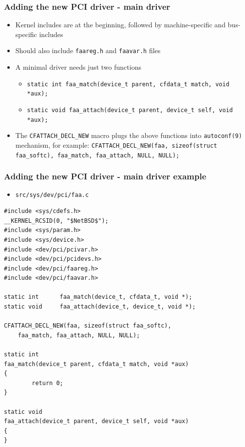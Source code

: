 \documentclass[dvipsnames,table]{beamer}
\begin{document}
\begin{frame}
\frametitle{Adding the new PCI driver - main driver}
\begin{itemize}
	\item Kernel includes are at the beginning, followed by machine-specific and bus-specific includes
	\item Should also include {\tt faareg.h} and {\tt faavar.h} files
	\item A minimal driver needs just two functions
	\begin{itemize}
		\item {\tt static int faa\_match(device\_t parent, cfdata\_t match, void *aux);}
		\item {\tt static void faa\_attach(device\_t parent, device\_t self, void *aux);}
	\end{itemize}
	\item The {\tt CFATTACH\_DECL\_NEW} macro plugs the above functions into {\tt autoconf(9)} mechanism, for example:
	{\tt CFATTACH\_DECL\_NEW(faa, sizeof(struct faa\_softc),
    faa\_match, faa\_attach, NULL, NULL);}
	
\end{itemize}
\end{frame}

\begin{frame}[fragile]
\frametitle{Adding the new PCI driver - main driver example}
\scriptsize
\begin{itemize}
	\item {\tt src/sys/dev/pci/faa.c}
\end{itemize}
\begin{lstlisting}
#include <sys/cdefs.h>
__KERNEL_RCSID(0, "$NetBSD$");
#include <sys/param.h>
#include <sys/device.h>
#include <dev/pci/pcivar.h>
#include <dev/pci/pcidevs.h>
#include <dev/pci/faareg.h>
#include <dev/pci/faavar.h>

static int      faa_match(device_t, cfdata_t, void *);
static void     faa_attach(device_t, device_t, void *);

CFATTACH_DECL_NEW(faa, sizeof(struct faa_softc),
    faa_match, faa_attach, NULL, NULL);

static int
faa_match(device_t parent, cfdata_t match, void *aux)
{
        return 0;
}

static void
faa_attach(device_t parent, device_t self, void *aux)
{ 
}
\end{lstlisting}
\end{frame}
\end{document}
